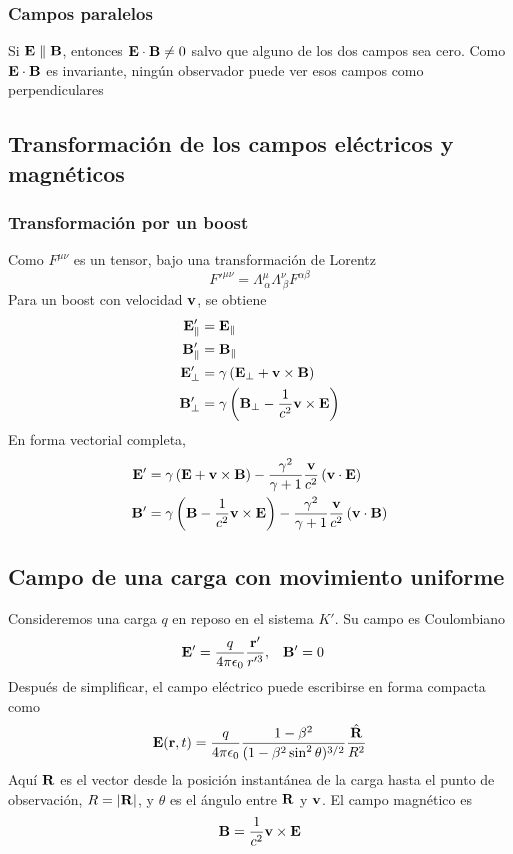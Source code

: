 \documentclass[]{article}
\numberwithin{equation}{section}
\begin{document}
\subsubsection{Campos paralelos}
Si $\mathbf{E}\parallel\mathbf{B}$, entonces $\mathbf{E} \cdot \mathbf{B} \neq 0$ salvo que alguno de los dos campos sea cero. Como $\mathbf{E} \cdot \mathbf{B}$ es invariante, ningún observador puede ver esos campos como perpendiculares

\subsection{Transformación de los campos eléctricos y magnéticos}
\subsubsection{Transformación por un boost}
Como $F^{\mu\nu}$ es un tensor, bajo una transformación de Lorentz
\begin{equation}
	F'^{\mu\nu} = \Lambda^\mu_{\, \alpha} \Lambda^\nu_{\, \beta} F^{\alpha\beta}
\end{equation}
Para un boost con velocidad $\mathbf{v}$, se obtiene
\begin{align}
	\mathbf{E}'_\parallel &= \mathbf{E}_\parallel\\
	\mathbf{B}'_\parallel &= \mathbf{B}_\parallel\\
	\mathbf{E}'_\perp &= \gamma \left(\mathbf{E}_\perp + \mathbf{v}\times\mathbf{B}\right)\\
	\mathbf{B}'_\perp &= \gamma \left(\mathbf{B}_\perp - \frac{1}{c^2} \mathbf{v}\times\mathbf{E}\right)
\end{align}
En forma vectorial completa,
\begin{align}
	\mathbf{E}' &= \gamma\left(\mathbf{E} + \mathbf{v}\times\mathbf{B}\right) - \frac{\gamma^2}{\gamma + 1} \frac{\mathbf{v}}{c^2} \left(\mathbf{v}\cdot\mathbf{E}\right)\\
	\mathbf{B}' &= \gamma\left(\mathbf{B} - \frac{1}{c^2} \mathbf{v}\times\mathbf{E}\right) - \frac{\gamma^2}{\gamma + 1} \frac{\mathbf{v}}{c^2} \left(\mathbf{v}\cdot\mathbf{B}\right)
\end{align}

\subsection{Campo de una carga con movimiento uniforme}
Consideremos una carga $q$ en reposo en el sistema $K'$. Su campo es Coulombiano
\begin{align*}
	\n{E}' &= \ke[q] \frac{\rv'}{r'^3}, & \n{B}' &= 0
\end{align*}
Después de simplificar, el campo eléctrico puede escribirse en forma compacta como
\begin{equation}
	\n{E}(\rv,t) = \ke[q] \frac{1 - \beta^2}{(1 - \beta^2 \sin^2\theta)^{3/2}} \frac{\hat{\n{R}}}{R^2}
\end{equation}
Aquí $\mathbf{R}$ es el vector desde la posición instantánea de la carga hasta el punto de observación, $R = |\mathbf{R}|$, y $\theta$ es el ángulo entre $\mathbf{R}$ y $\mathbf{v}$. El campo magnético es
\begin{equation}
	\mathbf{B} = \frac{1}{c^2} \mathbf{v}\times\mathbf{E}
\end{equation}
\end{document}
